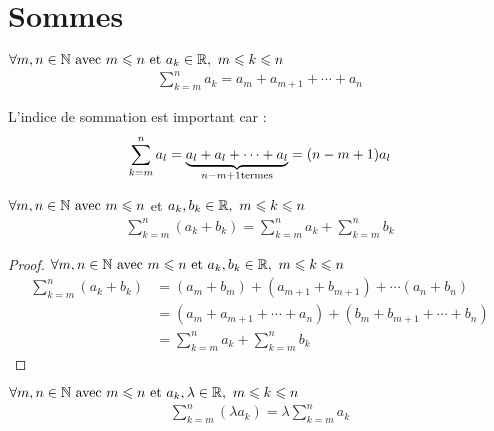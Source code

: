\section{Sommes}

\begin{graybox}
	\begin{definition}
		$\forall m, n \in \mathbb{N} \textnormal{ avec } m \leqslant n \textnormal{ et } a_k \in \mathbb{R}, \ m \leqslant k \leqslant n$
		\begin{align*}
			\sum_{k = m}^{n}a_k = a_m + a_{m+1} + \cdots + a_n	
		\end{align*}
	\end{definition}
\end{graybox}

\begin{remarque}
	L'indice de sommation est important car :
	\begin{align*}
		\sum_{k = m}^{n}a_l = \underbrace{a_l + a_l + \cdots + a_l}_{n - m + 1 \textnormal{termes}} = (n - m + 1)a_l
	\end{align*}
\end{remarque}

\begin{graybox}
	\begin{proposition}
		$\forall m, n \in \mathbb{N} \text{ avec } m \leqslant n$ et $a_k, b_k \in \mathbb{R}, \ m \leqslant k \leqslant n$
		\begin{align*}
			\sum_{k = m}^{n} (a_k + b_k) = \sum_{k=m}^{n}a_k + \sum_{k=m}^{n}b_k	
		\end{align*}
	\end{proposition}
\end{graybox}

\begin{proof}
	$\forall m, n \in \mathbb{N} \text{ avec } m \leqslant n \textnormal{ et } a_k, b_k \in \mathbb{R}, \ m \leqslant k \leqslant n$
	\begin{align*}
		\sum_{k = m}^{n} (a_k + b_k) &= (a_m + b_m) + (a_{m+1} + b_{m+1}) + \cdots (a_n + b_n)\\
		&= (a_m + a_{m+1} + \cdots + a_n) + (b_m + b_{m+1} + \cdots + b_n) \\
		&= \sum_{k=m}^{n}a_k + \sum_{k=m}^{n}b_k
	\end{align*}
\end{proof}

\begin{graybox}
	\begin{proposition}
		$\forall m, n \in \mathbb{N} \textnormal{ avec } m \leqslant n \textnormal{ et } a_k, \lambda \in \mathbb{R}, \ m \leqslant k \leqslant n$
		\begin{align*}
			\sum_{k = m}^{n} (\lambda a_k) = \lambda \sum_{k = m}^{n} a_k	
		\end{align*}
	\end{proposition}
\end{graybox}

